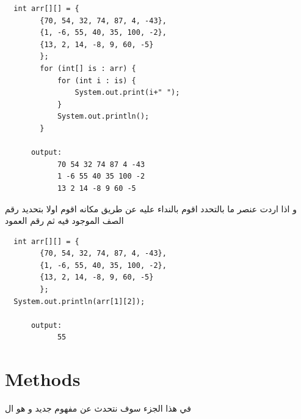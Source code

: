 \begin{verbatim}
  int arr[][] = {
        {70, 54, 32, 74, 87, 4, -43},
        {1, -6, 55, 40, 35, 100, -2},
        {13, 2, 14, -8, 9, 60, -5}
        };
        for (int[] is : arr) {
            for (int i : is) {
                System.out.print(i+" ");
            }
            System.out.println();
        }

      output:
            70 54 32 74 87 4 -43 
            1 -6 55 40 35 100 -2 
            13 2 14 -8 9 60 -5 
\end{verbatim}

\begin{AR}
  و اذا اردت عنصر ما بالتحدد اقوم بالنداء عليه عن طريق مكانه اقوم اولا بتحديد رقم الصف الموجود فيه ثم رقم العمود
\end{AR}

\begin{verbatim}
  int arr[][] = {
        {70, 54, 32, 74, 87, 4, -43},
        {1, -6, 55, 40, 35, 100, -2},
        {13, 2, 14, -8, 9, 60, -5}
        };
  System.out.println(arr[1][2]);

      output:
            55
\end{verbatim}

\section{Methods}
\begin{AR}
في هذا الجزء سوف نتحدث عن مفهوم جديد و هو ال 
\end{AR}

